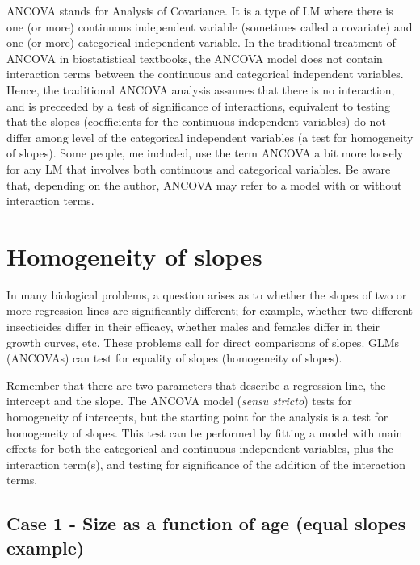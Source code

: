 \documentclass[
  12pt,
]{book}
\begin{document}
ANCOVA stands for Analysis of Covariance. It is a type of LM where there is one (or more) continuous independent variable (sometimes called a covariate) and one (or more) categorical independent variable. In the traditional treatment of ANCOVA in biostatistical textbooks, the ANCOVA model does not contain interaction terms between the continuous and categorical independent variables. Hence, the traditional ANCOVA analysis assumes that there is no interaction, and is preceeded by a test of significance of interactions, equivalent to testing that the slopes (coefficients for the continuous independent variables) do not differ among level of the categorical independent variables (a test for homogeneity of slopes). Some people, me included, use the term ANCOVA a bit more loosely for any LM that involves both continuous and categorical variables. Be aware that, depending on the author, ANCOVA may refer to a model with or without interaction terms.

\hypertarget{homogeneity-of-slopes}{%
\section{Homogeneity of slopes}\label{homogeneity-of-slopes}}

In many biological problems, a question arises as to whether the slopes of two or more regression lines are significantly different; for example, whether two different insecticides differ in their efficacy, whether males and females differ in their growth curves, etc. These problems call for direct comparisons of slopes. GLMs (ANCOVAs) can test for equality of slopes (homogeneity of slopes).

Remember that there are two parameters that describe a regression line, the intercept and the slope. The ANCOVA model (\emph{sensu stricto}) tests for homogeneity of intercepts, but the starting point for the analysis is a test for homogeneity of slopes. This test can be performed by fitting a model with main effects for both the categorical and continuous independent variables, plus the interaction term(s), and testing for significance of the addition of the interaction terms.

\hypertarget{case-1---size-as-a-function-of-age-equal-slopes-example}{%
\subsection{Case 1 - Size as a function of age (equal slopes example)}\label{case-1---size-as-a-function-of-age-equal-slopes-example}}
\end{document}
